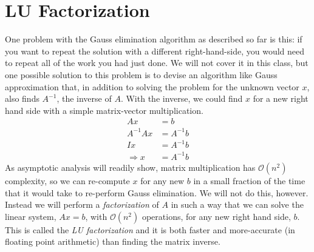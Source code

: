\setcounter{lstannotation}{0} %
\section{LU Factorization}
One problem with the Gauss elimination algorithm as described so far is this:  if you want to repeat the solution with a different right-hand-side, you would need to repeat all of the work you had just done.  We will not cover it in this class, but one possible solution to this problem is to devise an algorithm like Gauss approximation that, in addition to solving the problem for the unknown vector $x$, also finds $A^{-1}$, the inverse of $A$.  With the inverse, we could find $x$ for a new right hand side with a simple matrix-vector multiplication.
\begin{align*}
Ax &= b \\
A^{-1}Ax &= A^{-1}b \\
Ix &= A^{-1}b \\
\Rightarrow x &= A^{-1}b
\end{align*}
As asymptotic analysis will readily show, matrix multiplication has $\mathcal{O}(n^2)$ complexity, so we can re-compute $x$ for any new $b$ in a small fraction of the time that it would take to re-perform Gauss elimination.  
We will not do this, however.  Instead we will perform a \emph{factorization} of $A$ in such a way that we can solve the linear system, $Ax=b$, with $\mathcal{O}(n^2)$ operations, for any new right hand side, $b$. This is called the \emph{LU factorization} and it is both faster and more-accurate (in floating point arithmetic) than finding the matrix inverse.\cite{higham-matrix-inverse} 

